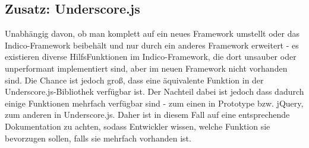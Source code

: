 \subsection{Zusatz: Underscore.js}
Unabhängig davon, ob man komplett auf ein neues Framework umstellt oder das Indico-Framework
beibehält und nur durch ein anderes Framework erweitert - es existieren diverse HilfsFunktionen im
Indico-Framework, die dort unsauber oder unperformant implementiert sind, aber im neuen Framework
nicht vorhanden sind. Die Chance ist jedoch groß, dass eine äquivalente Funktion in der
Underscore.js-Bibliothek verfügbar ist. Der Nachteil dabei ist jedoch dass dadurch einige Funktionen
mehrfach verfügbar sind - zum einen in Prototype bzw. jQuery, zum anderen in Underscore.js. Daher
ist in diesem Fall auf eine entsprechende Dokumentation zu achten, sodass Entwickler wissen, welche
Funktion sie bevorzugen sollen, falls sie mehrfach vorhanden ist.


